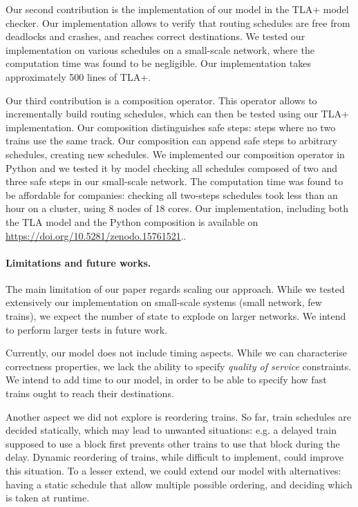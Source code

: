 \documentclass[runningheads]{llncs}
\begin{document}
Our second contribution is the implementation of our model in the TLA+ model checker. Our implementation allows to verify that routing schedules are free from deadlocks and crashes, and reaches correct destinations. We tested our implementation on various schedules on a small-scale network, where the computation time was found to be negligible. Our implementation takes approximately 500 lines of TLA+.

Our third contribution is a composition operator. This operator allows to incrementally build routing schedules, which can then be tested using our TLA+ implementation. Our composition distinguishes safe steps: steps where no two trains use the same track. Our composition can append safe steps to arbitrary schedules, creating new schedules. We implemented our composition operator in Python and we tested it by model checking all schedules composed of two and three safe steps in our small-scale network. The computation time was found to be affordable for companies: checking all two-steps schedules took less than an hour on a cluster, using 8 nodes of 18 cores.
Our implementation, including both the TLA model and the Python composition is available on \url{https://doi.org/10.5281/zenodo.15761521}..

\paragraph{Limitations and future works.}
The main limitation of our paper regards scaling our approach. While we tested extensively our implementation on small-scale systems (small network, few trains), we expect the number of state to explode on larger networks. We intend to perform larger tests in future work.

Currently, our model does not include timing aspects. While we can characterise correctness properties, we lack the ability to specify \emph{quality of service} constraints. We intend to add time to our model, in order to be able to specify how fast trains ought to reach their destinations.

Another aspect we did not explore is reordering trains. So far, train schedules are decided statically, which may lead to unwanted situations: e.g. a delayed train supposed to use a block first prevents other trains to use that block during the delay. Dynamic reordering of trains, while difficult to implement, could improve this situation. To a lesser extend, we could extend our model with alternatives: having a static schedule that allow multiple possible ordering, and deciding which is taken at runtime.
\end{document}
